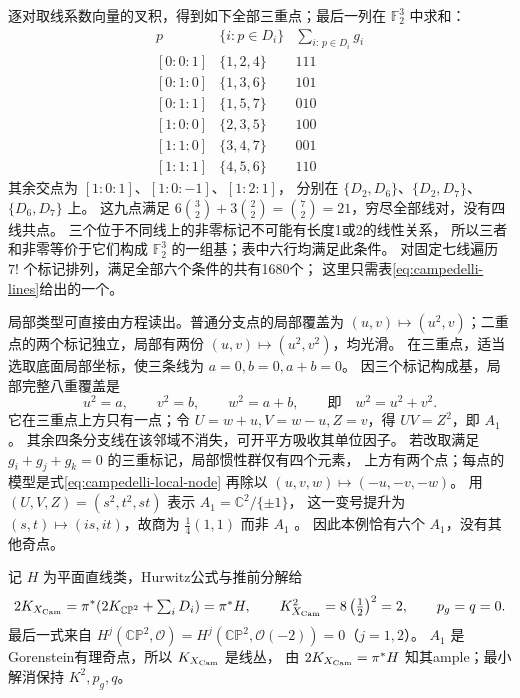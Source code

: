 \documentclass[UTF8,a4paper,11pt,fontset=fandol]{ctexart}
\numberwithin{equation}{section}
\theoremstyle{definition}
\newcommand{\CP}{\mathbb{CP}}
\begin{document}
逐对取线系数向量的叉积，得到如下全部三重点；最后一列在 $\mathbb F_2^3$ 中求和：
\begin{equation}\label{eq:campedelli-incidences}
\begin{array}{c|c|c}
p&\{i:p\in D_i\}&\sum_{i:\,p\in D_i}g_i\\ \hline
{[0:0:1]}&\{1,2,4\}&111\\
{[0:1:0]}&\{1,3,6\}&101\\
{[0:1:1]}&\{1,5,7\}&010\\
{[1:0:0]}&\{2,3,5\}&100\\
{[1:1:0]}&\{3,4,7\}&001\\
{[1:1:1]}&\{4,5,6\}&110
\end{array}
\end{equation}
其余交点为 $[1:0:1]$、$[1:0:-1]$、$[1:2:1]$，
分别在 $\{D_2,D_6\}$、$\{D_2,D_7\}$、$\{D_6,D_7\}$ 上。
这九点满足 $6\binom32+3\binom22=\binom72=21$，穷尽全部线对，没有四线共点。
三个位于不同线上的非零标记不可能有长度1或2的线性关系，
所以三者和非零等价于它们构成 $\mathbb F_2^3$ 的一组基；表中六行均满足此条件。
对固定七线遍历 $7!$ 个标记排列，满足全部六个条件的共有1680个；
这里只需表\eqref{eq:campedelli-lines}给出的一个。

局部类型可直接由方程读出。普通分支点的局部覆盖为
$(u,v)\mapsto(u^2,v)$；二重点的两个标记独立，局部有两份
$(u,v)\mapsto(u^2,v^2)$，均光滑。
在三重点，适当选取底面局部坐标，使三条线为 $a=0,b=0,a+b=0$。
因三个标记构成基，局部完整八重覆盖是
\begin{equation}\label{eq:campedelli-local-node}
u^2=a,\qquad v^2=b,\qquad w^2=a+b,
\qquad\text{即}\quad w^2=u^2+v^2.
\end{equation}
它在三重点上方只有一点；令 $U=w+u,V=w-u,Z=v$，得 $UV=Z^2$，即 $A_1$。
其余四条分支线在该邻域不消失，可开平方吸收其单位因子。
若改取满足 $g_i+g_j+g_k=0$ 的三重标记，局部惯性群仅有四个元素，
上方有两个点；每点的模型是式\eqref{eq:campedelli-local-node}
再除以 $(u,v,w)\mapsto(-u,-v,-w)$。
用 $(U,V,Z)=(s^2,t^2,st)$ 表示 $A_1=\mathbb C^2/\{\pm1\}$，
这一变号提升为 $(s,t)\mapsto(is,it)$，故商为 $\frac14(1,1)$ 而非 $A_1$
\cite[Table~1, cases~3.1, 3.3]{AlexeevPardiniCovers}。
因此本例恰有六个 $A_1$，没有其他奇点。

记 $H$ 为平面直线类，Hurwitz公式与推前分解给
\begin{equation}\label{eq:campedelli-invariants}
2K_{X_{\rm Cam}}=\pi^*(2K_{\CP^2}+\textstyle\sum_iD_i)=\pi^*H,
\qquad K_{X_{\rm Cam}}^2=8\left(\frac12\right)^2=2,
\qquad p_g=q=0.
\end{equation}
最后一式来自 $H^j(\CP^2,\mathcal O)=H^j(\CP^2,\mathcal O(-2))=0$（$j=1,2$）。
$A_1$ 是Gorenstein有理奇点，所以 $K_{X_{\rm Cam}}$ 是线丛，
由 $2K_{X_{\rm Cam}}=\pi^*H$ 知其ample；最小解消保持 $K^2,p_g,q$。
\end{document}
